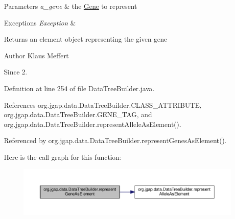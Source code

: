 \begin{DoxyParams}{Parameters}
{\em a\-\_\-gene} & the \hyperlink{interfaceorg_1_1jgap_1_1_gene}{Gene} to represent \\
\hline
\end{DoxyParams}

\begin{DoxyExceptions}{Exceptions}
{\em Exception} & \\
\hline
\end{DoxyExceptions}
\begin{DoxyReturn}{Returns}
an element object representing the given gene
\end{DoxyReturn}
\begin{DoxyAuthor}{Author}
Klaus Meffert 
\end{DoxyAuthor}
\begin{DoxySince}{Since}
2. 
\end{DoxySince}


Definition at line 254 of file Data\-Tree\-Builder.\-java.



References org.\-jgap.\-data.\-Data\-Tree\-Builder.\-C\-L\-A\-S\-S\-\_\-\-A\-T\-T\-R\-I\-B\-U\-T\-E, org.\-jgap.\-data.\-Data\-Tree\-Builder.\-G\-E\-N\-E\-\_\-\-T\-A\-G, and org.\-jgap.\-data.\-Data\-Tree\-Builder.\-represent\-Allele\-As\-Element().



Referenced by org.\-jgap.\-data.\-Data\-Tree\-Builder.\-represent\-Genes\-As\-Element().



Here is the call graph for this function\-:
\nopagebreak
\begin{figure}[H]
\begin{center}
\leavevmode
\includegraphics[width=350pt]{classorg_1_1jgap_1_1data_1_1_data_tree_builder_ad9aa494f1ea433a65851dd001f800ec8_cgraph}
\end{center}
\end{figure}


